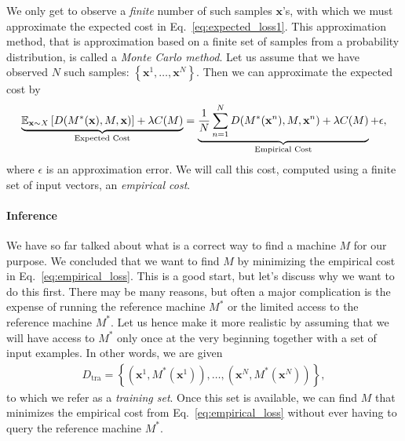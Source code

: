 \documentclass{report}
\newcommand{\vect}[1]{\mathbf{#1}}
\newcommand{\vx}[0]{\vect{x}}
\begin{document}
We only get to observe a {\it finite} number of such samples $\vx$'s, with which
we must approximate the expected cost in Eq.~\eqref{eq:expected_loss1}. This
approximation method, that is approximation based on a finite set of samples
from a probability distribution, is called a {\it Monte Carlo method}.  Let us
assume that we have observed $N$ such samples: $\left\{ \vx^1, \ldots, \vx^N
\right\}$. Then we can approximate the expected cost by
\begin{align}
    \label{eq:empirical_loss}
    \underbrace{\mathbb{E}_{\vx \sim X} \left[ D(M^*(\vx), M, \vx) \right] +
    \lambda C(M)}_{
        \mathclap{\text{Expected Cost}}
    } =
    \underbrace{
        \frac{1}{N} \sum_{n=1}^N D(M^*(\vx^n), M, \vx^n)
        + \lambda C(M)
    }_{\mathclap{\text{Empirical Cost}}} + \epsilon,
\end{align}
where $\epsilon$ is an approximation error. We will call this cost, computed
using a finite set of input vectors, an {\it empirical cost}. 

\paragraph{Inference}

We have so far talked about what is a correct way to find a machine $M$ for our
purpose. We concluded that we want to find $M$ by minimizing the empirical cost
in Eq.~\eqref{eq:empirical_loss}. This is a good start, but let's discuss why we
want to do this first. There may be many reasons, but often a major complication
is the expense of running the reference machine $M^*$ or the limited access to
the reference machine $M^*$. Let us hence make it more realistic by assuming
that we will have access to $M^*$ only once at the very beginning together with
a set of input examples. In other words, we are given
\begin{align*}
    D_{\text{tra}} = \left\{ (\vx^1, M^*(\vx^1)), \ldots, (\vx^N,
    M^*(\vx^N))\right\},
\end{align*}
to which we refer as a {\it training set}. Once this set is available, we can
find $M$ that minimizes the empirical cost from Eq.~\eqref{eq:empirical_loss}
without ever having to query the reference machine $M^*$. 
\end{document}
